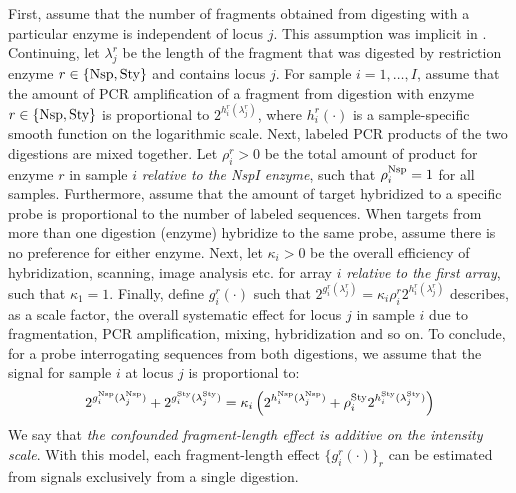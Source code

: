 \documentclass{bioinfo}
\newcommand{\NspI}{\emph{Nsp}I\xspace}
\newcommand{\Nsp}{\ensuremath{\textnormal{Nsp}}\xspace}
\newcommand{\Sty}{\ensuremath{\textnormal{Sty}}\xspace}
\begin{document}
First, assume that the number of fragments obtained from digesting with a particular enzyme is independent of locus $j$.  This assumption was implicit in \citet{BengtssonH_etal_2008a}.
Continuing, let $\lambda^{r}_j$ be the length of the fragment that was digested by restriction enzyme $r \in \{\Nsp, \Sty\}$ and contains locus $j$.
For sample $i=1,\ldots,I$, assume that the amount of PCR amplification of a fragment from digestion with enzyme $r \in \{\Nsp, \Sty\}$ is proportional to $2^{h^{r}_{i}(\lambda^{r}_{j})}$, where $h^{r}_{i}(\cdot)$ is a sample-specific smooth function on the logarithmic scale.
Next, labeled PCR products of the two digestions are mixed together.  Let $\rho^{r}_{i} > 0$ be the total amount of product for enzyme $r$ in sample $i$ \emph{relative to the \NspI enzyme}, such that $\rho^{\Nsp}_{i}=1$ for all samples.
Furthermore, assume that the amount of target hybridized to a specific probe is proportional to the number of labeled sequences.  When targets from more than one digestion (enzyme) hybridize to the same probe, assume there is no preference for either enzyme. 
Next, let $\kappa_{i} > 0$ be the overall efficiency of hybridization, scanning, image analysis etc. for array $i$ \emph{relative to the first array}, such that $\kappa_{1} = 1$.
Finally, define $g^{r}_{i}(\cdot)$ such that $2^{g^{r}_{i}(\lambda^{r}_{j})} = \kappa_{i} \rho^{r}_{i} 2^{h^{r}_{i}(\lambda^{r}_{j})}$ describes, as a scale factor, the overall systematic effect for locus $j$ in sample $i$  due to fragmentation, PCR amplification, mixing, hybridization and so on.
To conclude, for a probe interrogating sequences from both digestions, we assume that the signal for sample $i$ at locus $j$ is proportional to:
 \begin{equation}
  2^{g^{\Nsp}_{i}(\lambda^{\Nsp}_{j})} + 2^{g^{\Sty}_{i}(\lambda^{\Sty}_{j})}
  = \kappa_{i} \left(
      2^{h^{\Nsp}_{i}(\lambda^{\Nsp}_{j})}
      + \rho^{\Sty}_{i} 2^{h^{\Sty}_{i}(\lambda^{\Sty}_{j})}
    \right)
 \end{equation}
We say that \emph{the confounded fragment-length effect is additive on the intensity scale}. %
With this model, each fragment-length effect $\{g_i^r(\cdot)\}_r$ can be estimated from signals exclusively from a single digestion.
\end{document}
